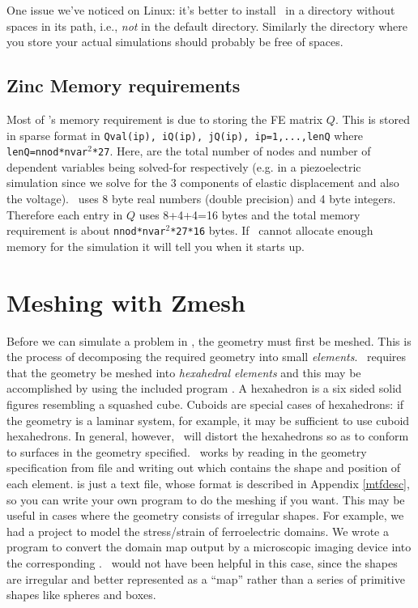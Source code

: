 \documentclass[a4paper,twoside,11pt]{book}
\begin{document}
One issue we've noticed on Linux: it's better to install \zinc\ in a directory
without spaces in its path, i.e., \emph{not} in the default
directory. Similarly the directory where you store your actual
simulations should probably be free of spaces.

\section{Zinc Memory requirements}
\label{memory}

Most of \zinc's memory requirement is due to storing the FE matrix
$Q$. This is stored in sparse format in \texttt{Qval(ip), iQ(ip),
  jQ(ip), ip=1,...,lenQ} where \texttt{lenQ=nnod*nvar$^2$*27}. Here,
 are the total number of nodes and number of dependent
variables being solved-for respectively (e.g. in a piezoelectric
simulation  since we solve for the 3 components of elastic
displacement and also the voltage). \zinc\ uses 8 byte real numbers
(double precision) and 4 byte integers. Therefore each entry in $Q$
uses 8+4+4=16 bytes and the total memory requirement is about
\texttt{nnod*nvar$^2$*27*16} bytes. If \zinc\ cannot allocate enough
memory for the simulation it will tell you when it starts up.

\chapter{Meshing with Zmesh}
\label{zmeshchap}

Before we can simulate a problem in \zinc, the geometry must first be
meshed. This is the process of decomposing the required geometry into
small \emph{elements}. \zinc\ requires that the geometry be meshed
into \emph{hexahedral elements} and this may be accomplished by using
the included program \zmesh. A hexahedron is a six sided solid figures
resembling a squashed cube. Cuboids are special cases of hexahedrons:
if the geometry is a laminar system, for example, it may be sufficient
to use cuboid hexahedrons. In general, however, \zmesh\ will distort
the hexahedrons so as to conform to surfaces in the geometry
specified. \zmesh\ works by reading in the geometry specification from
file  and writing out  which contains the
shape and position of each element.  is just a text
file, whose format is described in Appendix \ref{mtfdesc}, so you can
write your own program to do the meshing if you want. This may be
useful in cases where the geometry consists of irregular shapes. For
example, we had a project to model the stress/strain of ferroelectric
domains. We wrote a program to convert the domain map output by a
microscopic imaging device into the corresponding
. \zmesh\ would not have been helpful in this case,
since the shapes are irregular and better represented as a ``map''
rather than a series of primitive shapes like spheres and boxes.
\end{document}
